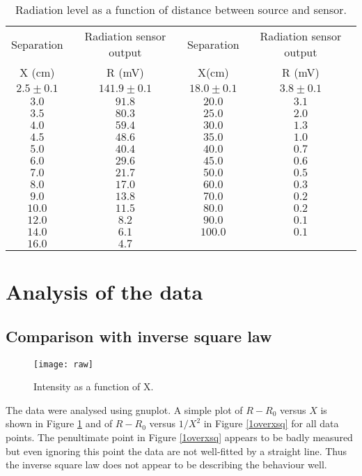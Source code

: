 \documentclass[10pt]{iopart}
\begin{document}
\begin{table}
  \centering
  \caption{Radiation level as a function of distance between source
and sensor.\\}\label{table1}
\begin{tabular}{|c|c||c|c|}
\hline
Separation  & Radiation sensor output  & Separation
 & Radiation sensor output \\
X (cm)&R (mV)&X(cm)&R (mV)\\
\hline $2.5 \pm 0.1$ & $ 141.9 \pm 0.1$ & $ 18.0 \pm 0.1$ & $ 3.8 \pm 0.1$\\
$3.0$ & $91.8$ & $20.0$ & $3.1$\\
$3.5$ & $80.3$ & $25.0$ & $2.0$\\
$4.0$ & $59.4$ & $30.0$ & $1.3$\\
$4.5$ & $48.6$ & $35.0$ & $1.0$\\
$5.0$ & $40.4$ & $40.0$ & $0.7$\\
$6.0$ & $29.6$ & $45.0$ & $0.6$\\
$7.0$ & $21.7$ & $50.0$ & $0.5$\\
$8.0$ & $17.0$ & $60.0$ & $0.3$\\
$9.0$ & $13.8$ & $70.0$ & $0.2$\\
$10.0$ & $11.5$ & $80.0$ & $0.2$\\
$12.0$ & $8.2$ & $90.0$ & $0.1$\\
$14.0$ & $6.1$ & $100.0$ & $0.1$\\
$16.0$ & $4.7$&&\\
\hline
\end{tabular}
\end{table}

\section{Analysis of the data}

\subsection{Comparison with inverse square law}

\begin{figure}
  \centering
  \texttt{[image: raw]}\\
  \caption{Intensity as a function of X.}\label{raw}
\end{figure}

The data were analysed using gnuplot. A simple plot of $R-R_0$
versus $X$ is shown in Figure \ref{raw} and of $R-R_0$ versus
$1/X^2$ in Figure \ref{1overxsq} for all data points. The
penultimate point in Figure \ref{1overxsq} appears to be badly
measured but even ignoring this point the data are not well-fitted
by a straight line. Thus the inverse square law does not appear to
be describing the behaviour well.
\end{document}
